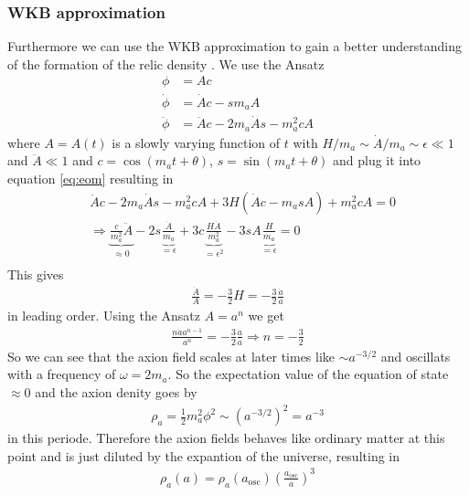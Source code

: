 \documentclass[a4paper]{article}
\begin{document}
\subsubsection{WKB approximation}
Furthermore we can use the WKB approximation to gain a better understanding of the formation of the relic density \cite[Chap 4.3.1, Page 28]{MarshAxionCosmo}.
We use the Ansatz
\begin{align*}
    \phi &= A c \\
    \dot{\phi} &= \dot{A} c - s m_a A \\
    \ddot{\phi} &= \ddot{A} c - 2 m_a \dot{A} s - m_a^2 c A
\end{align*}
where $A = A(t)$ is a slowly varying function of $t$ with $H / m_a \sim \dot{A} / m_a \sim \epsilon \ll 1$ and $\ddot{A} \ll 1$
and $c = \cos(m_a t + \theta)$, $s = \sin(m_a t + \theta) $
and plug it into equation \ref{eq:eom}
resulting in
\begin{align*}
    &\ddot{A} c - 2 m_a \dot{A} s - m_a^2 c A + 3 H ( \dot{A} c - m_a s A) + m_a^2 c A = 0 \\
    &\Rightarrow \underbrace{\frac{c}{m_a^2} \ddot{A}}_{\approx 0} - 2 s \underbrace{\frac{\dot{A}}{m_a}}_{= \epsilon} + 3c \underbrace{\frac{H \dot{A}}{m_a^2}}_{= \epsilon^2} - 3 s A \underbrace{\frac{H}{m_a}}_{= \epsilon} = 0 \\
\end{align*}
This gives
\begin{align*}
    \frac{\dot{A}}{A} = - \frac{3}{2} H = - \frac{3}{2} \frac{\dot{a}}{a}
\end{align*}
in leading order.
Using the Ansatz $A = a^n$ we get
\begin{align*}
    \frac{n \dot{a} a^{n - 1}}{a^n} = - \frac{3}{2} \frac{\dot{a}}{a} \Rightarrow n = - \frac{3}{2}
\end{align*}
So we can see that the axion field scales at later times like $\sim a^{-3/2}$
and oscillats with a frequency of $\omega = 2m_a$. So
the expectation value of the equation of state $\approx 0$ and the axion denity goes by
\begin{align*}
    \rho_a = \frac{1}{2}m_a^2\phi^2 \sim \left(a^{-3/2}\right)^2 = a^{-3}
\end{align*}
in this periode. Therefore the axion fields behaves like ordinary matter at this point and
is just diluted by the expantion of the universe, resulting in \cite[Chap. 4.3.1, Page 28]{MarshAxionCosmo}
\begin{align}
    \label{eq:wkb_axion_denity}
    \rho_a(a) = \rho_a(a_\mathrm{osc}) \left( \frac{a_\mathrm{osc}}{a} \right)^3
\end{align}
\end{document}
